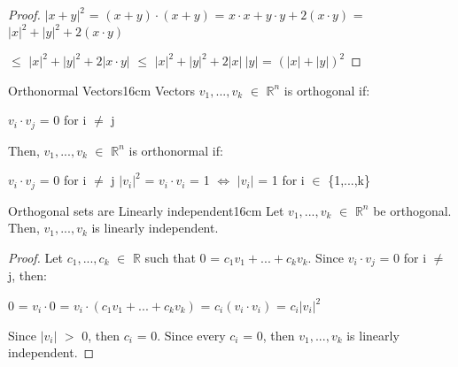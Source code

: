     \begin{proof}
        $|x+y|^2$
        = $(x+y) \cdot (x+y)$
        = $x \cdot x + y \cdot y + 2(x \cdot y)$
        = $|x|^2 + |y|^2 +2(x \cdot y)$

        \hspace{1.35cm}
        $\leq$ $|x|^2 + |y|^2 +2|x \cdot y|$
        $\leq$ $|x|^2 + |y|^2 +2|x| \ |y|$
        = $(|x| + |y|)^2$
    \end{proof}

    \vspace{0.5cm}



    \begin{definition}{Orthonormal Vectors}{16cm}
        Vectors $v_1,...,v_k$ $\in$ $\mathbb{R}^n$
        is {\color{lblue} orthogonal} if:
        
        \hspace{0.5cm}
        $v_i \cdot v_j$ = 0 for i $\not =$ j

        Then, $v_1,...,v_k$ $\in$ $\mathbb{R}^n$
        is {\color{lblue} orthonormal} if:
        
        \hspace{0.5cm}
        $v_i \cdot v_j$ = 0 for i $\not =$ j
        \hspace{1cm}
        $|v_i|^2$ = $v_i \cdot v_i$ = 1
        \hspace{0.5cm}
        $\Leftrightarrow$
        \hspace{0.5cm}
        $|v_i|$ = 1
        for i $\in$ \{1,...,k\}
    \end{definition}

    \vspace{0.5cm}



    \begin{wtheorem}{Orthogonal sets are Linearly independent}{16cm}
        Let $v_1,...,v_k$ $\in$ $\mathbb{R}^n$ be orthogonal.
        Then, $v_1,...,v_k$ is linearly independent.
    \end{wtheorem}

    \begin{proof}
        Let $c_1,...,c_k$ $\in$ $\mathbb{R}$ such that
        0 = $c_1v_1 + ... + c_kv_k$.
        Since $v_i \cdot v_j$ = 0 for i $\not =$ j, then:

        \hspace{0.5cm}
        0 = $v_i \cdot 0$
        = $v_i \cdot (c_1v_1 + ... + c_kv_k)$
        = $c_i(v_i \cdot v_i)$
        = $c_i|v_i|^2$

        Since $|v_i|$ $>$ 0, then $c_i$ = 0.
        Since every $c_i$ = 0, then $v_1,...,v_k$ is linearly independent.
    \end{proof}

